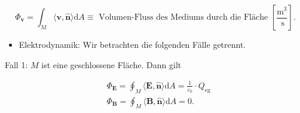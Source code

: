 \documentclass[10pt]{article}
\begin{document}
\begin{equation*}
\Phi_{\mathbf{v}}=\int_{M}\langle\mathbf{v}, \hat{\mathbf{n}}\rangle \mathrm{d} A \equiv \text { Volumen-Fluss des Mediums durch die Fläche }\left[\frac{\mathrm{m}^{3}}{\mathrm{~s}}\right] . \tag{2.128}
\end{equation*}


\begin{itemize}
  \item Elektrodynamik: Wir betrachten die folgenden Fälle getrennt.
\end{itemize}

Fall 1: $M$ ist eine geschlossene Fläche. Dann gilt


\begin{align*}
& \Phi_{\mathbf{E}}=\oint_{M}\langle\mathbf{E}, \hat{\mathbf{n}}\rangle \mathrm{d} A=\frac{1}{\varepsilon_{0}} \cdot Q_{\mathrm{eg}}  \tag{2.129}\\
& \Phi_{\mathbf{B}}=\oint_{M}\langle\mathbf{B}, \hat{\mathbf{n}}\rangle \mathrm{d} A=0 . \tag{2.130}
\end{align*}
\end{document}
